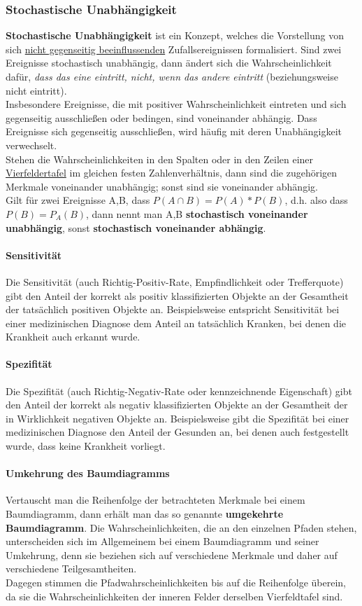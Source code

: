 \documentclass[a4paper,10pt,DIV9, BCOR12mm, oneside,openright,openbib]{scrreprt}
\theoremstyle{definition}
\theoremstyle{plain}
\begin{document}
\subsubsection{Stochastische Unabhängigkeit}
\textbf{Stochastische Unabhängigkeit} ist ein Konzept, welches die Vorstellung von sich \underline{nicht gegenseitig beeinflussenden} Zufallsereignissen formalisiert. Sind zwei Ereignisse stochastisch unabhängig, dann ändert sich die Wahrscheinlichkeit dafür, \textit{dass das eine eintritt, nicht, wenn das andere eintritt} (beziehungsweise nicht eintritt). \\ 
Insbesondere Ereignisse, die mit positiver Wahrscheinlichkeit eintreten und sich gegenseitig ausschließen oder bedingen, sind voneinander abhängig. Dass Ereignisse sich gegenseitig ausschließen, wird häufig mit deren Unabhängigkeit verwechselt.\\ 
\linebreak
Stehen die Wahrscheinlichkeiten in den Spalten oder in den Zeilen einer \underline{Vierfeldertafel} im gleichen festen Zahlenverhältnis, dann sind die zugehörigen Merkmale voneinander unabhängig; sonst sind sie voneinander abhängig. \\
\linebreak
Gilt für zwei Ereignisse A,B, dass $ P({A}\cap{B})= P(A) * P(B) $, d.h. also dass $ P(B) = P_{A}(B)$, dann nennt man A,B \textbf{stochastisch voneinander unabhängig}, sonst  \textbf{stochastisch voneinander abhängig}.
\paragraph{Sensitivität}
Die Sensitivität (auch Richtig-Positiv-Rate, Empfindlichkeit oder Trefferquote) gibt den Anteil der korrekt als positiv klassifizierten Objekte an der Gesamtheit der tatsächlich positiven Objekte an. Beispielsweise entspricht Sensitivität bei einer medizinischen Diagnose dem Anteil an tatsächlich Kranken, bei denen die Krankheit auch erkannt wurde.
\paragraph{Spezifität}
Die Spezifität (auch Richtig-Negativ-Rate oder kennzeichnende Eigenschaft) gibt den Anteil der korrekt als negativ klassifizierten Objekte an der Gesamtheit der in Wirklichkeit negativen Objekte an. Beispielsweise gibt die Spezifität bei einer medizinischen Diagnose den Anteil der Gesunden an, bei denen auch festgestellt wurde, dass keine Krankheit vorliegt.
\paragraph{Umkehrung des Baumdiagramms}
Vertauscht man die Reihenfolge der betrachteten Merkmale bei einem Baumdiagramm, dann erhält man das so genannte \textbf{umgekehrte Baumdiagramm}. Die Wahrscheinlichkeiten, die an den einzelnen Pfaden stehen, unterscheiden sich im Allgemeinem bei einem Baumdiagramm und seiner Umkehrung, denn sie beziehen sich auf verschiedene Merkmale und daher auf verschiedene Teilgesamtheiten. \\
Dagegen stimmen die Pfadwahrscheinlichkeiten bis auf die Reihenfolge überein, da sie die Wahrscheinlichkeiten der inneren Felder derselben Vierfeldtafel sind.
\end{document}

